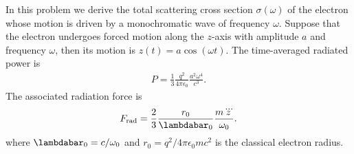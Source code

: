 \documentclass{article}
\theoremstyle{definition}
\newcommand{\f}[2]{\frac{#1}{#2}}
\begin{document}
\noindent In this problem we derive the total scattering cross section $\sigma(\omega)$ of the electron whose motion is driven by a monochromatic wave of frequency $\omega$. Suppose that the electron undergoes forced motion along the $z$-axis with amplitude $a$ and frequency $\omega$, then its motion is $z(t) = a\cos(\omega t)$. The time-averaged radiated power is 
\begin{align*}
P = \f{1}{3} \f{q^2}{4\pi \epsilon_0} \f{a^2 \omega^4}{c^3}. 
\end{align*}
The associated radiation force is 
\begin{align*}
F_\text{rad} = \f{2}{3} \f{r_0}{\lambdabar_0} \f{m \dddot{z}}{\omega_0}.
\end{align*}
where $\lambdabar_0 = c/\omega_0$ and $r_0 = q^2/4\pi \epsilon_0 mc^2$ is the classical electron radius. 
\end{document}

